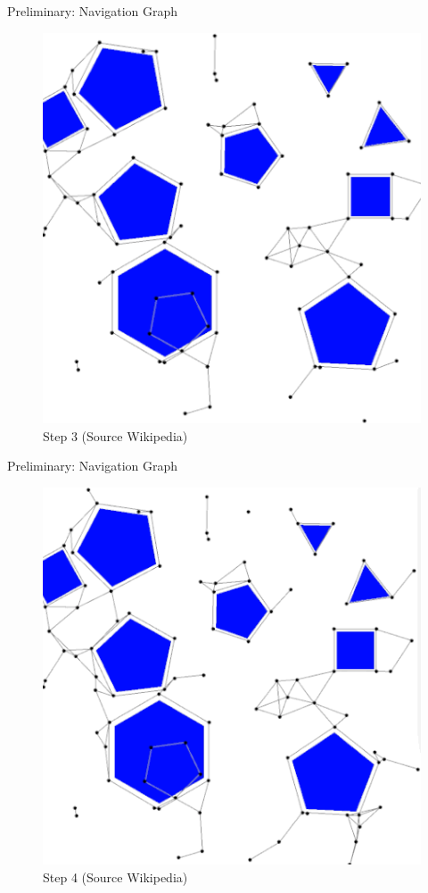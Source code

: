 \documentclass[ignorenonframetext,aspectratio=169,]{paradise-slide}
\begin{document}
\begin{frame}[fragile]{Preliminary: Navigation Graph}
\protect\hypertarget{preliminary-navigation-graph-2}{}

\begin{figure}
\centering
\includegraphics{PRM-2.png}
\caption{Step 3 (Source Wikipedia)}
\end{figure}

\addtocounter{framenumber}{-1}

\end{frame}

\begin{frame}[fragile]{Preliminary: Navigation Graph}
\protect\hypertarget{preliminary-navigation-graph-3}{}

\begin{figure}
\centering
\includegraphics{PRM-3.png}
\caption{Step 4 (Source Wikipedia)}
\end{figure}

\addtocounter{framenumber}{-1}

\end{frame}
\end{document}

